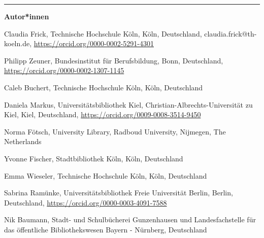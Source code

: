 \begin{center}\rule{0.5\linewidth}{0.5pt}\end{center}

\textbf{Autor*innen}

Claudia Frick, Technische Hochschule Köln, Köln, Deutschland, claudia.frick@th-koeln.de, \url{https://orcid.org/0000-0002-5291-4301}

Philipp Zeuner, Bundesinstitut für Berufsbildung, Bonn, Deutschland, \url{https://orcid.org/0000-0002-1307-1145}

Caleb Buchert, Technische Hochschule Köln, Köln, Deutschland

Daniela Markus, Universitätsbibliothek Kiel, Christian-Albrechts-Universität zu Kiel, Kiel, Deutschland, \url{https://orcid.org/0009-0008-3514-9450}

Norma Fötsch, University Library, Radboud University, Nijmegen, The Netherlands

Yvonne Fischer, Stadtbibliothek Köln, Köln, Deutschland

Emma Wieseler, Technische Hochschule Köln, Köln, Deutschland

Sabrina Ramünke, Universitätsbibliothek Freie Universität Berlin, Berlin, Deutschland, \url{https://orcid.org/0000-0003-4091-7588}

Nik Baumann, Stadt- und Schulbücherei Gunzenhausen und Landesfachstelle für das öffentliche Bibliothekswesen Bayern - Nürnberg, Deutschland
